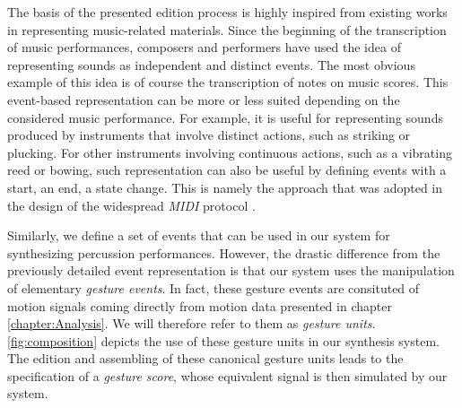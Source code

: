 The basis of the presented edition process is highly inspired from existing works in representing music-related materials. Since the beginning of the transcription of music performances, composers and performers have used the idea of representing sounds as independent and distinct events. The most obvious example of this idea is of course the transcription of notes on music scores. This event-based representation can be more or less suited depending on the considered music performance. For example, it is useful for representing sounds produced by instruments that involve distinct actions, such as striking or plucking. For other instruments involving continuous actions, such as a vibrating reed or bowing, such representation can also be useful by defining events with a start, an end, a state change. This is namely the approach that was adopted in the design of the widespread \emph{MIDI} protocol .

Similarly, we define a set of events that can be used in our system for synthesizing percussion performances. However, the drastic difference from the previously detailed event representation is that our system uses the manipulation of elementary \emph{gesture events}. In fact, these gesture events are consituted of motion signals coming directly from motion data presented in chapter \ref{chapter:Analysis}. We will therefore refer to them as \emph{gesture units}. \myfigname \ref{fig:composition} depicts the use of these gesture units in our synthesis system. The edition and assembling of these canonical gesture units leads to the specification of a \emph{gesture score}, whose equivalent signal is then simulated by our system.

